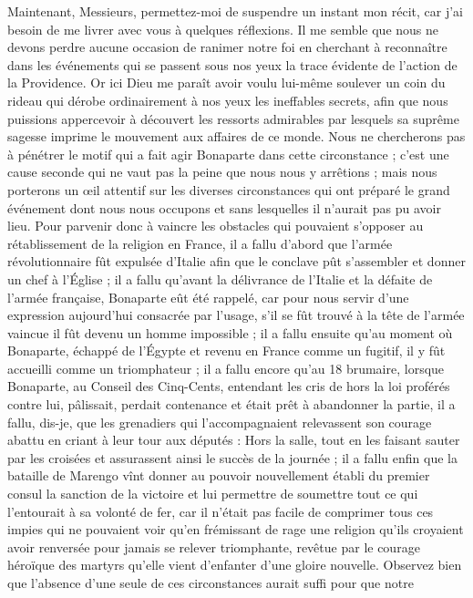Maintenant, Messieurs, permettez-moi de suspendre un instant mon récit, car j’ai besoin de me livrer avec vous à quelques réflexions. Il me semble que nous ne devons perdre aucune occasion de ranimer notre foi en cherchant à reconnaître dans les événements qui se passent sous nos yeux la trace évidente de l'action de la Providence. Or ici Dieu me paraît avoir voulu lui-même soulever un coin du rideau qui dérobe ordinairement à nos yeux les ineffables secrets, afin que nous puissions appercevoir à découvert les ressorts admirables par lesquels sa suprême sagesse imprime le mouvement aux affaires de ce monde. Nous ne chercherons pas à pénétrer le motif qui a fait agir Bonaparte dans cette circonstance ; c'est une cause seconde qui ne vaut pas la peine que nous nous y arrêtions ; mais nous porterons un œil attentif sur les diverses circonstances qui ont préparé le grand événement dont nous nous occupons et sans lesquelles il n'aurait pas pu avoir lieu. Pour parvenir donc à vaincre les obstacles qui pouvaient s'opposer au rétablissement de la religion en France,
il a fallu d'abord que l'armée révolutionnaire fût expulsée d'Italie afin que le conclave pût s'assembler et donner un chef à l'Église ; il a fallu qu'avant la délivrance de l'Italie et la défaite de l'armée française, Bonaparte eût été rappelé, car pour nous servir d'une expression aujourd'hui consacrée par l'usage, s'il se fût trouvé à la tête de l'armée vaincue il fût devenu un homme impossible ; il a fallu ensuite qu'au moment où Bonaparte, échappé de l'Égypte et revenu en France comme un fugitif, il y fût accueilli comme un triomphateur ; il a fallu encore qu'au 18 brumaire, lorsque Bonaparte, au Conseil des Cinq-Cents, entendant les cris de hors la loi proférés contre lui, pâlissait, perdait contenance et était prêt à abandonner la partie, il a fallu, dis-je, que les grenadiers qui l'accompagnaient relevassent son courage abattu en criant à leur tour aux députés : Hors la salle, tout en les faisant sauter par les croisées et assurassent ainsi le succès de la journée ; il a fallu enfin que la bataille de Marengo vînt donner au pouvoir nouvellement établi du premier consul la sanction de la victoire et lui permettre de soumettre tout ce qui l'entourait à sa volonté de fer, car il n'était pas facile de comprimer tous ces impies qui ne pouvaient voir qu'en frémissant de rage une religion qu'ils croyaient avoir renversée pour jamais se relever triomphante, revêtue par le courage héroïque des martyrs qu'elle vient d'enfanter d'une gloire nouvelle. Observez bien que l'absence d'une seule de ces circonstances aurait suffi pour que notre
